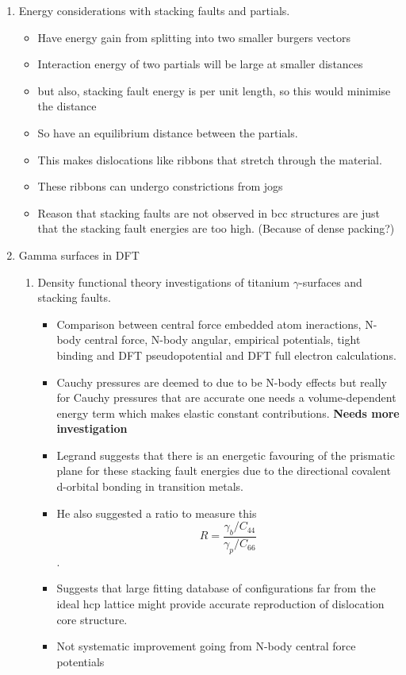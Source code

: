 \documentclass[11pt]{article}
\begin{document}
\begin{enumerate}
\item Energy considerations with stacking faults and partials.
\label{sec-2-4-5-5}
\begin{itemize}
\item Have energy gain from splitting into two smaller burgers vectors
\item Interaction energy of two partials will be large at smaller distances
\item but also, stacking fault energy is per unit length, so this would
minimise the distance
\item So have an equilibrium distance between the partials.
\item This makes dislocations like ribbons that stretch through the material.
\item These ribbons can undergo constrictions from jogs
\item Reason that stacking faults are not observed in bcc structures are just
that the stacking fault energies are too high. (Because of dense packing?)
\end{itemize}
\item Gamma surfaces in DFT
\label{sec-2-4-5-6}
\begin{enumerate}
\item{} Density functional theory investigations of titanium $\gamma$-surfaces and stacking faults.
\label{sec-2-4-5-6-1}
\begin{itemize}
\item Comparison between central force  embedded atom ineractions, N-body
central force, N-body angular, empirical potentials, tight binding and
DFT pseudopotential and DFT full electron calculations.
\item Cauchy pressures are deemed to due to be N-body effects but really for Cauchy
pressures that are accurate one needs a volume-dependent energy term
which makes elastic constant contributions. \textbf{\textbf{Needs more investigation}}
\item Legrand suggests that there is an energetic favouring of the prismatic
plane for these stacking fault energies due to the directional covalent
d-orbital bonding in transition metals.
\item He also suggested a ratio to measure this \[ R = \frac{\gamma_{b}/C_{44}}{\gamma_{p}/C_{66}} \].
\item Suggests that large fitting database of configurations far from the
ideal hcp lattice might provide accurate reproduction of dislocation
core structure.
\item Not systematic improvement going from N-body central force potentials

\end{itemize}
\end{enumerate}
\end{enumerate}
\end{document}

